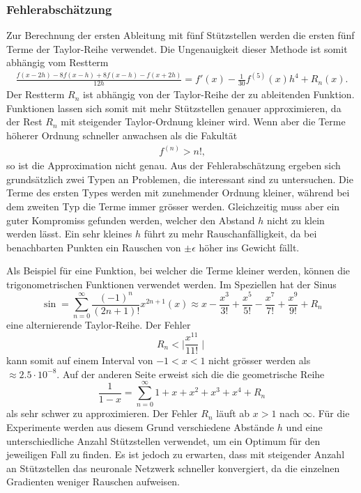 \subsubsection{Fehlerabschätzung}
Zur Berechnung der ersten Ableitung mit fünf Stützstellen werden die ersten fünf Terme der Taylor-Reihe verwendet. Die Ungenauigkeit dieser Methode ist somit abhängig vom Restterm
\begin{align}
\frac{f(x-2h) - 8f(x-h) + 8f(x-h) - f(x+2h)}{12h} = f'(x) - \frac{1}{30} f^{(5)} (x)h^{4}+R_n(x) \text{.}
\label{ableitung:eqn:error}
\end{align}
Der Restterm $R_{n}$ ist abhängig von der Taylor-Reihe der zu ableitenden Funktion. Funktionen lassen sich somit mit mehr Stützstellen genauer approximieren, da der Rest $R_n$ mit steigender Taylor-Ordnung kleiner wird. Wenn aber die Terme höherer Ordnung schneller anwachsen als die Fakultät
\begin{align}
	f^{(n)} > n! \text{,}
	\label{eqn:fakult}
\end{align}
so ist die Approximation nicht genau.
Aus der Fehlerabschätzung ergeben sich grundsätzlich zwei Typen an Problemen, die interessant sind zu untersuchen.
Die Terme des ersten Types werden mit zunehmender Ordnung kleiner, während bei dem zweiten Typ die Terme immer grösser werden.
Gleichzeitig muss aber ein guter Kompromiss gefunden werden, welcher den Abstand $h$ nicht zu klein werden lässt. Ein sehr kleines $h$ führt zu mehr Rauschanfälligkeit, da bei benachbarten Punkten ein Rauschen von $\pm \epsilon$ höher ins Gewicht fällt.

Als Beispiel für eine Funktion, bei welcher die Terme kleiner werden, können die trigonometrischen Funktionen verwendet werden. Im Speziellen hat der Sinus
\begin{equation}
	\sin = \sum _{n=0}^{\infty }{\frac {(-1)^{n}}{(2n+1)!}}x^{2n+1} \left(x\right)\approx x-{\frac {x^{3}}{3!}}+{\frac {x^{5}}{5!}}-{\frac {x^{7}}{7!}}+{\frac{x^9}{9!}}+R_n
\end{equation}
eine alternierende Taylor-Reihe. Der Fehler
\begin{equation}
R_n < \mid {\frac{x^{11}}{11!} \mid}
\end{equation}
kann somit auf einem Interval von $-1<x<1$ nicht grösser werden als $\approx 2.5 \cdot 10^{-8}$.
Auf der anderen Seite erweist sich die die geometrische Reihe
\begin{equation}
	\frac{1}{1-x} = \sum _{n=0}^{\infty} 1 + x + x^2 + x^3 + x^4 + R_n
\end{equation}
als sehr schwer zu approximieren. Der Fehler $R_n$ läuft ab $x>1$ nach $\infty$.
Für die Experimente werden aus diesem Grund verschiedene Abstände $h$ und eine unterschiedliche Anzahl Stützstellen verwendet, um ein Optimum für den jeweiligen Fall zu finden. Es ist jedoch zu erwarten, dass mit steigender Anzahl an Stützstellen das neuronale Netzwerk schneller konvergiert, da die einzelnen Gradienten weniger Rauschen aufweisen.